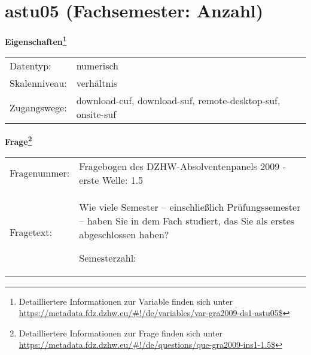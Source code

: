
    \setcounter{footnote}{0}

    \vspace*{-1.8cm}
	\section{astu05 (Fachsemester: Anzahl)}
	\label{section:astu05}



    \vspace*{0.5cm}
    \noindent\textbf{Eigenschaften\footnote{Detailliertere Informationen zur Variable finden sich unter
		\url{https://metadata.fdz.dzhw.eu/\#!/de/variables/var-gra2009-ds1-astu05$}}}\\
	\begin{tabularx}{\hsize}{@{}lX}
	Datentyp: & numerisch \\
	Skalenniveau: & verhältnis \\
	Zugangswege: &
	  download-cuf, 
	  download-suf, 
	  remote-desktop-suf, 
	  onsite-suf
 \\
    \end{tabularx}



				\vspace*{0.5cm}
                \noindent\textbf{Frage\footnote{Detailliertere Informationen zur Frage finden sich unter
		              \url{https://metadata.fdz.dzhw.eu/\#!/de/questions/que-gra2009-ins1-1.5$}}}\\
				\begin{tabularx}{\hsize}{@{}lX}
					Fragenummer: &
					  Fragebogen des DZHW-Absolventenpanels 2009 - erste Welle:
					  1.5
 \\
					Fragetext: & Wie viele Semester – einschließlich Prüfungssemester – haben Sie in dem Fach studiert, das Sie als erstes abgeschlossen haben?\par  Semesterzahl: \\
				\end{tabularx}





